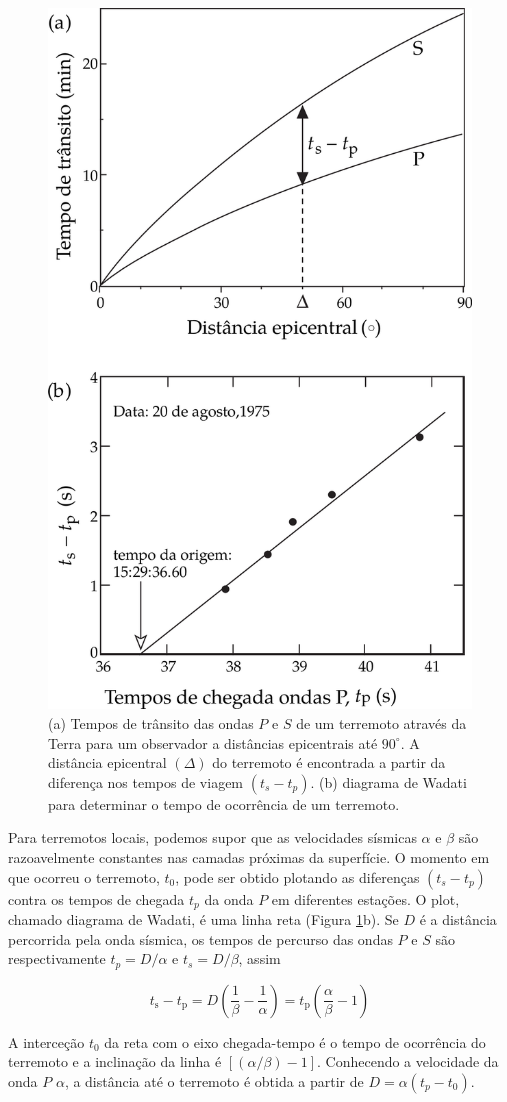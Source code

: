 \documentclass[]{book}
\theoremstyle{definition}
\theoremstyle{definition}
\theoremstyle{definition}
\theoremstyle{remark}
\begin{document}
\begin{figure}

{\centering \includegraphics[width=0.4\linewidth]{fig/Fig_03.17} 

}

\caption{(a) Tempos de trânsito das ondas $P$ e $S$ de um terremoto através da Terra para um observador a distâncias epicentrais até $90^\circ$. A distância epicentral $(\Delta)$ do terremoto é encontrada a partir da diferença nos tempos de viagem $(t_s - t_p)$. (b) diagrama de Wadati para determinar o tempo de ocorrência de um terremoto.}\label{fig:transitoPS}
\end{figure}

Para terremotos locais, podemos supor que as velocidades sísmicas \(\alpha\) e \(\beta\) são razoavelmente constantes nas camadas próximas da superfície. O momento em que ocorreu o terremoto, \(t_0\), pode ser obtido plotando as diferenças \((t_s - t_p)\) contra os tempos de chegada \(t_p\) da onda \(P\) em diferentes estações. O plot, chamado diagrama de Wadati, é uma linha reta (Figura \ref{fig:transitoPS}b). Se \(D\) é a distância percorrida pela onda sísmica, os tempos de percurso das ondas \(P\) e \(S\) são respectivamente \(t_p=D/\alpha\) e \(t_s= D/\beta\), assim

\begin{equation}
t_{\mathrm{s}}-t_{\mathrm{p}}=D\left(\frac{1}{\beta}-\frac{1}{\alpha}\right)=t_{\mathrm{p}}\left(\frac{\alpha}{\beta}-1\right)  \label{eq:0331}
\end{equation}

A interceção \(t_0\) da reta com o eixo chegada-tempo é o tempo de ocorrência do terremoto e a inclinação da linha é \([(\alpha/\beta)-1]\). Conhecendo a velocidade da onda \(P\) \(\alpha\), a distância até o terremoto é obtida a partir de \(D=\alpha(t_p - t_0)\).
\end{document}
